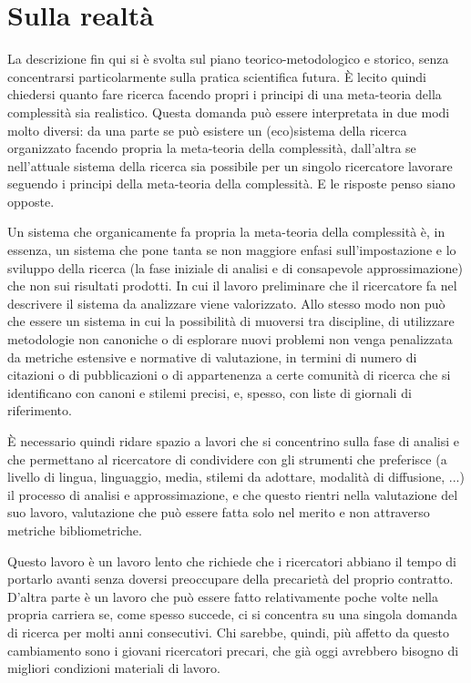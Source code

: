 \documentclass[a4paper, headings=standardclasses]{scrartcl}
\begin{document}
\section{Sulla realtà}
La descrizione fin qui si è svolta sul piano teorico-metodologico e storico, senza concentrarsi particolarmente sulla pratica scientifica futura.
È lecito quindi chiedersi quanto fare ricerca facendo propri i principi di una meta-teoria della complessità sia realistico.
Questa domanda può essere interpretata in due modi molto diversi: da una parte se può esistere un (eco)sistema della ricerca organizzato facendo propria la meta-teoria della complessità, dall'altra se nell'attuale sistema della ricerca sia possibile per un singolo ricercatore lavorare seguendo i principi della meta-teoria della complessità. E le risposte penso siano opposte.

Un sistema che organicamente fa propria la meta-teoria della complessità è, in essenza, un sistema che pone tanta se non maggiore enfasi sull'impostazione e lo sviluppo della ricerca (la fase iniziale di analisi e di consapevole approssimazione) che non sui risultati prodotti. In cui il lavoro preliminare che il ricercatore fa nel descrivere il sistema da analizzare viene valorizzato.
Allo stesso modo non può che essere un sistema in cui la possibilità di muoversi tra discipline, di utilizzare metodologie non canoniche o di esplorare nuovi problemi non venga penalizzata da metriche estensive e normative di valutazione, in termini di numero di citazioni o di pubblicazioni o di appartenenza a certe comunità di ricerca che si identificano con canoni e stilemi precisi, e, spesso, con liste di giornali di riferimento.

È necessario quindi ridare spazio a lavori che si concentrino sulla fase di analisi e che permettano al ricercatore di condividere con gli strumenti che preferisce (a livello di lingua, linguaggio, media, stilemi da adottare, modalità di diffusione, ...) il processo di analisi e approssimazione, e che questo rientri nella valutazione del suo lavoro, valutazione che può essere fatta solo nel merito e non attraverso metriche bibliometriche.

Questo lavoro è un lavoro lento che richiede che i ricercatori abbiano il tempo di portarlo avanti senza doversi preoccupare della precarietà del proprio contratto. D'altra parte è un lavoro che può essere fatto relativamente poche volte nella propria carriera se, come spesso succede, ci si concentra su una singola domanda di ricerca per molti anni consecutivi.
Chi sarebbe, quindi, più affetto da questo cambiamento sono i giovani ricercatori precari, che già oggi avrebbero bisogno di migliori condizioni materiali di lavoro.
\end{document}
